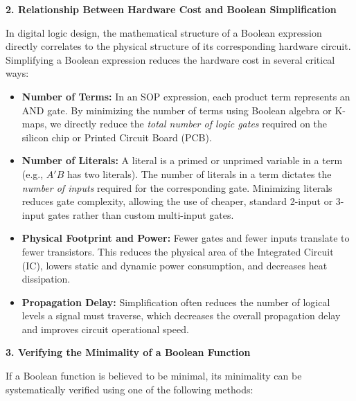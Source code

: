 \documentclass[12pt,a3paper]{article}
\begin{document}
\begin{enumerate}
\begin{tcolorbox}[enhanced,breakable,ansbox,colback=cA!4,colframe=cA,boxrule=0.8pt,arc=5pt,title={\textbf{Answer}},fonttitle=\bfseries\color{white},colbacktitle=cA]
\begin{center}
\begin{circuitikz}[scale=0.9, every node/.style={transform shape}]
\end{circuitikz}
\end{center}


\vspace{0.4cm}
\textbf{2. Relationship Between Hardware Cost and Boolean Simplification}

In digital logic design, the mathematical structure of a Boolean expression directly correlates to the physical structure of its corresponding hardware circuit. Simplifying a Boolean expression reduces the hardware cost in several critical ways:

\begin{itemize}
    \item \textbf{Number of Terms:} In an SOP expression, each product term represents an AND gate. By minimizing the number of terms using Boolean algebra or K-maps, we directly reduce the \textit{total number of logic gates} required on the silicon chip or Printed Circuit Board (PCB).
    \item \textbf{Number of Literals:} A literal is a primed or unprimed variable in a term (e.g., $A'B$ has two literals). The number of literals in a term dictates the \textit{number of inputs} required for the corresponding gate. Minimizing literals reduces gate complexity, allowing the use of cheaper, standard 2-input or 3-input gates rather than custom multi-input gates.
    \item \textbf{Physical Footprint and Power:} Fewer gates and fewer inputs translate to fewer transistors. This reduces the physical area of the Integrated Circuit (IC), lowers static and dynamic power consumption, and decreases heat dissipation.
    \item \textbf{Propagation Delay:} Simplification often reduces the number of logical levels a signal must traverse, which decreases the overall propagation delay and improves circuit operational speed.
\end{itemize}

\vspace{0.4cm}
\textbf{3. Verifying the Minimality of a Boolean Function}

If a Boolean function is believed to be minimal, its minimality can be systematically verified using one of the following methods:


\end{tcolorbox}
\end{enumerate}
\end{document}
